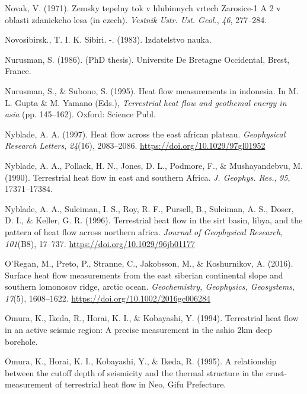 \documentclass[draft,linenumbers]{agujournal2018}
\begin{document}
\leavevmode{}%
Novak, V. (1971). Zemsky tepelny tok v hlubinnych vrtech {Zarosice-1 A
2} v oblasti zdanickeho lesa (in czech). \emph{Vestnik Ustr. Ust.
Geol.}, \emph{46}, 277--284.

\leavevmode{}%
Novosibirsk., T. I. K. Sibiri. -. (1983). Izdatelstvo nauka.

\leavevmode{}%
Nurusman, S. (1986). (PhD thesis). Universite De Bretagne Occidental,
Brest, France.

\leavevmode{}%
Nurusman, S., \& Subono, S. (1995). Heat flow measurements in indonesia.
In M. L. Gupta \& M. Yamano (Eds.), \emph{Terrestrial heat flow and
geothemal energy in asia} (pp. 145--162). Oxford: Science Publ.

\leavevmode{}%
Nyblade, A. A. (1997). Heat flow across the east african plateau.
\emph{Geophysical Research Letters}, \emph{24}(16), 2083--2086.
\url{https://doi.org/10.1029/97gl01952}

\leavevmode{}%
Nyblade, A. A., Pollack, H. N., Jones, D. L., Podmore, F., \&
Mushayandebvu, M. (1990). Terrestrial heat flow in east and southern
{Africa}. \emph{J. Geophys. Res.}, \emph{95}, 17371--17384.

\leavevmode{}%
Nyblade, A. A., Suleiman, I. S., Roy, R. F., Pursell, B., Suleiman, A.
S., Doser, D. I., \& Keller, G. R. (1996). Terrestrial heat flow in the
sirt basin, libya, and the pattern of heat flow across northern africa.
\emph{Journal of Geophysical Research}, \emph{101}(B8), 17--737.
\url{https://doi.org/10.1029/96jb01177}

\leavevmode{}%
O'Regan, M., Preto, P., Stranne, C., Jakobsson, M., \& Koshurnikov, A.
(2016). Surface heat flow measurements from the east siberian
continental slope and southern lomonosov ridge, arctic ocean.
\emph{Geochemistry, Geophysics, Geosystems}, \emph{17}(5), 1608--1622.
\url{https://doi.org/10.1002/2016gc006284}

\leavevmode{}%
Omura, K., Ikeda, R., Horai, K. I., \& Kobayashi, Y. (1994). Terrestrial
heat flow in an active seismic region: A precise measurement in the
ashio 2km deep borehole.

\leavevmode{}%
Omura, K., Horai, K. I., Kobayashi, Y., \& Ikeda, R. (1995). A
relationship between the cutoff depth of seismicity and the thermal
structure in the crust-measurement of terrestrial heat flow in {Neo,
Gifu Prefecture}.
\end{document}
